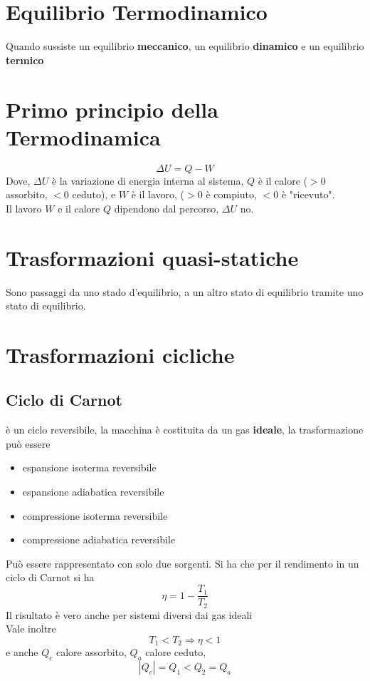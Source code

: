 \documentclass[a4paper]{report}
\begin{document}
  \section{Equilibrio Termodinamico}
  Quando sussiste un equilibrio \textbf{meccanico}, un equilibrio \textbf{dinamico} e un equilibrio \textbf{termico}\\

  \section{Primo principio della Termodinamica}
  \[ \Delta U = Q - W \]
  Dove, $\Delta U$ è la variazione di energia interna al sistema, $Q$ è il calore ($>0$ assorbito, $<0$ ceduto), e $W$ è il lavoro, ($>0$ è compiuto, $<0$ è "ricevuto".\\
  Il lavoro $W$ e il calore $Q$ dipendono dal percorso, $\Delta U$ no.

  \section{Trasformazioni quasi-statiche}
  Sono passaggi da uno stado d'equilibrio, a un altro stato di equilibrio tramite uno stato di equilibrio.

  \section{Trasformazioni cicliche}
  \subsection{Ciclo di Carnot}
  è un ciclo reversibile, la macchina è costituita da un gas \textbf{ideale}, la trasformazione può essere
  \begin{itemize}
    \item espansione isoterma reversibile
    \item espansione adiabatica reversibile
    \item compressione isoterma reversibile
    \item compressione adiabatica reversibile
  \end{itemize}
  Può essere rappresentato con solo due sorgenti. Si ha che per il rendimento in un ciclo di Carnot si ha
  \[ \eta = 1 - \frac{T_1}{T_2}\]
  Il risultato è vero anche per sistemi diversi dai gas ideali \\
  Vale inoltre
  \[ T_1 < T_2 \Rightarrow \eta < 1 \]
  e anche $Q_c$ calore assorbito, $Q_a$ calore ceduto,
  \[ |Q_c| = Q_1 < Q_2 = Q_a \]
\end{document}
